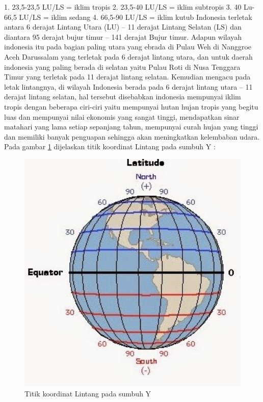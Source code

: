 1. 23,5-23,5 LU/LS = iklim tropis
2. 23,5-40 LU/LS = iklim subtropis
3. 40 Lu-66,5 LU/LS = iklim sedang
4. 66,5-90 LU/LS = iklim kutub
Indonesia terletak antara 6 derajat Lintang Utara (LU) – 11 derajat Lintang Selatan (LS) dan diantara 95 derajat bujur timur – 141 derajat Bujur timur.
Adapun wilayah indonesia itu pada bagian paling utara yang ebrada di Pulau Weh di Nanggroe Aceh Darussalam yang terletak pada 6 derajat lintang utara, dan untuk daerah indonesia yang paling berada di selatan yaitu Pulau Roti di Nusa Tenggara Timur yang terletak pada 11 derajat lintang selatan. Kemudian mengacu pada letak lintangnya, di wilayah Indonesia berada pada 6 derajat lintang utara – 11 derajat lintang selatan, hal tersebut disebabkan indonesia mempunyai iklim tropis dengan beberapa ciri-ciri yaitu mempunyai hutan hujan tropis yang begitu luas dan mempunyai nilai ekonomis yang sangat tinggi, mendapatkan sinar matahari yang lama setiap sepanjang tahun, mempunyai curah hujan yang tinggi dan memiliki banyak penguapan sehingga akan meningkatkan kelembaban udara.
Pada gambar \ref{lintang} dijelaskan titik koordinat Lintang pada sumbuh Y :
\begin{figure}[ht]
	\centerline{\includegraphics[width=1\textwidth]{figures/lintang.JPG}}
	\caption{Titik koordinat Lintang pada sumbuh Y}
	\label{lintang}
	\end{figure}

